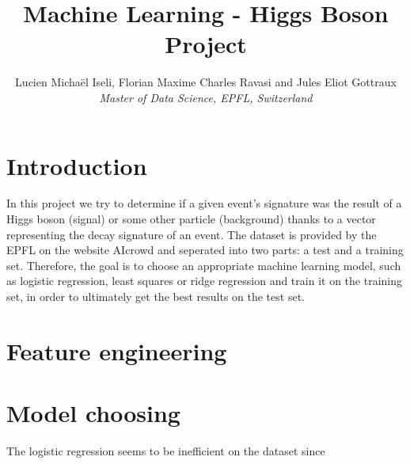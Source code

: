 \documentclass[10pt,conference,compsocconf]{IEEEtran}
\begin{document}
\title{Machine Learning - Higgs Boson Project}

\author{
  Lucien Michaël Iseli, Florian Maxime Charles Ravasi and Jules Eliot Gottraux\\
  \textit{Master of Data Science, EPFL, Switzerland}
}

\maketitle

\section{Introduction}
In this project we try to determine if a given event's signature was the result of a Higgs boson (signal) or some other particle (background) thanks to a vector representing the decay signature of an event. The dataset is provided by the EPFL on the website AIcrowd and seperated into two parts: a test and a training set. Therefore, the goal is to choose an appropriate machine learning model, such as logistic regression, least squares or ridge regression and train it on the training set, in order to ultimately get the best results on the test set.
\section{Feature engineering}

\section{Model choosing}
The logistic regression seems to be inefficient on the dataset since 
\end{document}
